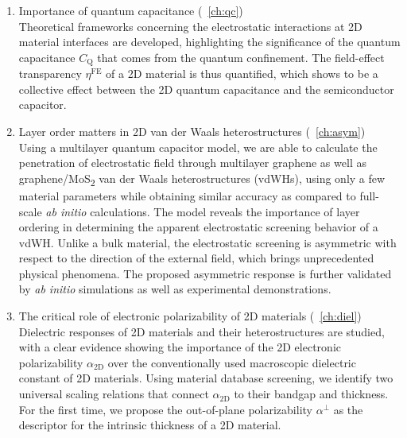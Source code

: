 \begin{enumerate}
\item Importance of quantum capacitance (~\autoref{ch:qc})\\
  Theoretical frameworks concerning the electrostatic interactions at
  2D material interfaces are developed, highlighting the significance
  of the quantum capacitance $C_{\mathrm{Q}}$ that comes from the
  quantum confinement. The field-effect transparency
  $\eta^{\mathrm{FE}}$ of a 2D material is thus quantified, which
  shows to be a collective effect between the 2D quantum capacitance
  and the semiconductor capacitor.

  
\item Layer order matters in 2D van der Waals heterostructures (~\autoref{ch:asym})\\
  Using a multilayer quantum capacitor model, we are able to calculate
  the penetration of electrostatic field through multilayer graphene
  as well as graphene/MoS\textsubscript{2} van der Waals
  heterostructures (vdWHs), using only a few material parameters while
  obtaining similar accuracy as compared to full-scale \textit{ab
    initio} calculations. The model reveals the importance of layer
  ordering in determining the apparent electrostatic screening
  behavior of a vdWH. Unlike a bulk material, the electrostatic
  screening is asymmetric with respect to the direction of the
  external field, which brings unprecedented physical phenomena. The
  proposed asymmetric response is further validated by \textit{ab
    initio} simulations as well as experimental demonstrations.
  
\item The critical role of electronic polarizability of 2D materials
  (~\autoref{ch:diel})\\
  Dielectric responses of 2D materials and their heterostructures are
  studied, with a clear evidence showing the importance of the 2D
  electronic polarizability $\alpha_{\mathrm{2D}}$ over the
  conventionally used macroscopic dielectric constant of 2D
  materials. Using material database screening, we identify two
  universal scaling relations that connect $\alpha_{\mathrm{2D}}$ to
  their bandgap and thickness. For the first time, we propose the
  out-of-plane polarizability $\alpha^{\perp}$ as the descriptor for
  the intrinsic thickness of a 2D material.


\end{enumerate}
